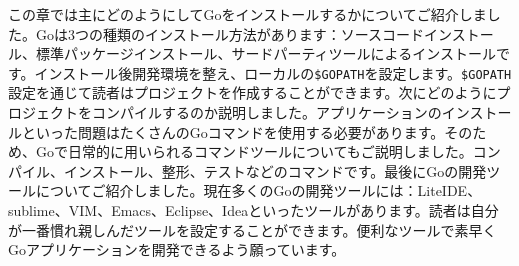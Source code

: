 この章では主にどのようにしてGoをインストールするかについてご紹介しました。Goは3つの種類のインストール方法があります：ソースコードインストール、標準パッケージインストール、サードパーティツールによるインストールです。インストール後開発環境を整え、ローカルの\texttt{\$GOPATH}を設定します。\texttt{\$GOPATH}設定を通じて読者はプロジェクトを作成することができます。次にどのようにプロジェクトをコンパイルするのか説明しました。アプリケーションのインストールといった問題はたくさんのGoコマンドを使用する必要があります。そのため、Goで日常的に用いられるコマンドツールについてもご説明しました。コンパイル、インストール、整形、テストなどのコマンドです。最後にGoの開発ツールについてご紹介しました。現在多くのGoの開発ツールには：LiteIDE、sublime、VIM、Emacs、Eclipse、Ideaといったツールがあります。読者は自分が一番慣れ親しんだツールを設定することができます。便利なツールで素早くGoアプリケーションを開発できるよう願っています。
